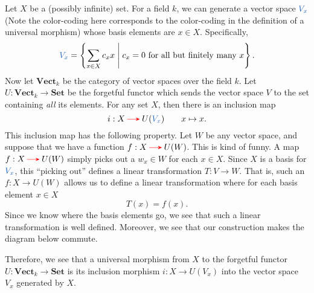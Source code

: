 \begin{example}
        Let $X$ be a (possibly infinite) set. For a field $k$, we can generate a vector space $\textcolor{NavyBlue}{V_x}$ (Note 
        the color-coding here corresponds to the color-coding in the definition of a universal 
        morphism) whose basis
        elements are $x \in X$. Specifically,
        \[
            \textcolor{NavyBlue}{V_x} = \left\{ \sum_{x \in X}c_x x \;\middle|\; c_x = 0 \text{ for all but finitely many }x \right\}.
        \]
        Now let $\textbf{Vect}_{k}$ be the category of vector spaces
        over the field $k$. Let $U: \textbf{Vect}_{k} \to
        \textbf{Set}$ be the forgetful functor which sends the vector space
        $V$ to the set containing \emph{all} its elements. For any set $X$, 
        then there is an inclusion map 
        \[
            i: X \mathbin{\textcolor{red}{\to}} U(\textcolor{NavyBlue}{V_x}) \qquad x \mapsto x.           
        \]
        This inclusion map has the following property.
        Let $W$ be any vector space, and suppose that we have
        a function $f: X \mathbin{\textcolor{red}{\to}} U(W)$. 
        This is kind of funny. A map $f: X \mathbin{\textcolor{red}{\to}} U(W)$ 
        simply picks out a $w_x \in W$ for each $x \in X$. Since $X$ is a basis for $\textcolor{NavyBlue}{V_x}$, 
        this ``picking out'' defines a linear transformation $T: V \to W$. That is, such an 
        $f: X \to U(W)$ allows us to define a linear transformation where for each basis element
        $x \in X$
        \[
            T(x) = f(x).
        \]
        Since we know where the basis elements go, we see that such a linear transformation is well defined.
        Moreover, we see that our construction makes the diagram below commute. 
        \begin{center}
            \hspace{1cm}
        \end{center}
        Therefore, we see that a universal morphism from $X$ to the forgetful functor 
        $U: \textbf{Vect}_k \to \textbf{Set}$ is its inclusion morphism $i: X \to U(V_x)$ 
        into the vector space $V_x$ generated by $X$.
    \end{example}

